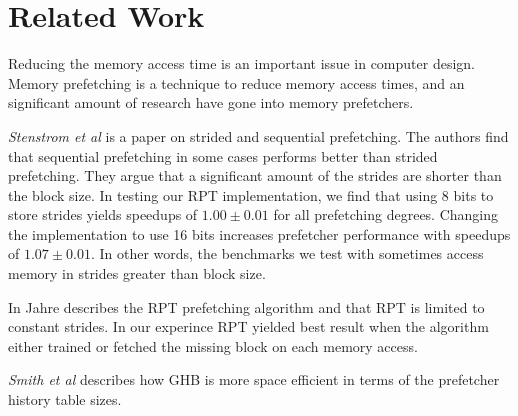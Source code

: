 \section{Related Work}
\label{sec:related-work}

Reducing the memory access time is an important issue in computer
design.  Memory prefetching is a technique to reduce memory access
times, and an significant amount of research have gone into memory
prefetchers.

\textit{Stenstrom et al} \cite{bib:stride} is a paper on strided and
sequential prefetching.  The authors find that sequential prefetching
in some cases performs better than strided prefetching.  They argue
that a significant amount of the strides are shorter than the block
size.  In testing our RPT implementation, we find that using 8 bits to
store strides yields speedups of $1.00\pm0.01$ for all prefetching
degrees. Changing the implementation to use 16 bits increases
prefetcher performance with speedups of $1.07\pm0.01$. In other words,
the benchmarks we test with sometimes access memory in strides greater
than block size.

In \cite{bib:jahre}
Jahre describes the RPT prefetching algorithm and that RPT is limited to constant strides.
In our experince RPT yielded best result when the algorithm either trained or fetched the missing block on each memory access.

\textit{Smith et al} \cite{bib:ghb}
describes how GHB is more space efficient in terms of the prefetcher history table sizes.




